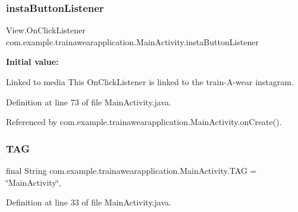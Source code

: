 \subsubsection{\texorpdfstring{instaButtonListener}{instaButtonListener}}
{\footnotesize\ttfamily View.\+On\+Click\+Listener com.\+example.\+trainawearapplication.\+Main\+Activity.\+insta\+Button\+Listener\hspace{0.3cm}{\ttfamily [private]}}

{\bfseries Initial value\+:}
\begin{DoxyCode}{0}
\DoxyCodeLine{        \}}
\DoxyCodeLine{    \}}

\end{DoxyCode}


Linked to media This On\+Click\+Listener is linked to the train-\/\+A-\/wear instagram. 



Definition at line 73 of file Main\+Activity.\+java.



Referenced by com.\+example.\+trainawearapplication.\+Main\+Activity.\+on\+Create().

\mbox{\label{classcom_1_1example_1_1trainawearapplication_1_1_main_activity_a03992dd3287317fb72593c3bea10f322}} 
\subsubsection{\texorpdfstring{TAG}{TAG}}
{\footnotesize\ttfamily final String com.\+example.\+trainawearapplication.\+Main\+Activity.\+T\+AG = \char`\"{}Main\+Activity\char`\"{}\hspace{0.3cm}{\ttfamily [static]}, {\ttfamily [package]}}



Definition at line 33 of file Main\+Activity.\+java.




